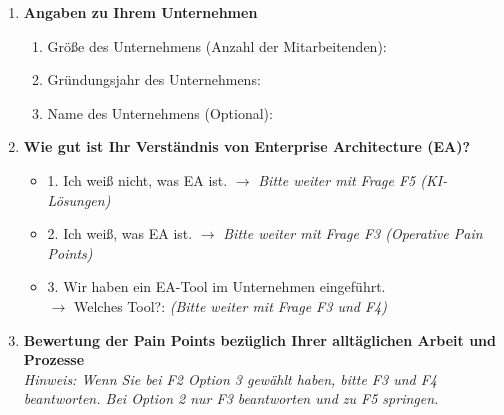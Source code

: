 \documentclass[11pt,a4paper]{article}
\begin{document}
\begin{enumerate}[label=\textbf{F\arabic*.}, leftmargin=*, itemsep=0.2cm]

    \item \textbf{Angaben zu Ihrem Unternehmen}
    \begin{enumerate}[label=\alph*), itemsep=0.05cm, topsep=0.05cm]
        \item Größe des Unternehmens (Anzahl der Mitarbeitenden): \underline{\hspace{5cm}}
        \item Gründungsjahr des Unternehmens: \underline{\hspace{5cm}}
        \item Name des Unternehmens (Optional): \underline{\hspace{5cm}}
    \end{enumerate}

    \vspace{0.1cm}

    \item \textbf{Wie gut ist Ihr Verständnis von Enterprise Architecture (EA)?}
    \begin{itemize}[label=$\bigcirc$, itemsep=0.02cm, topsep=0.05cm]
        \item 1. Ich weiß nicht, was EA ist. $\rightarrow$ \textit{Bitte weiter mit Frage F5 (KI-Lösungen)}
        \item 2. Ich weiß, was EA ist. $\rightarrow$ \textit{Bitte weiter mit Frage F3 (Operative Pain Points)}
        \item 3. Wir haben ein EA-Tool im Unternehmen eingeführt. \\
        $\rightarrow$ Welches Tool?: \underline{\hspace{5cm}} \textit{(Bitte weiter mit Frage F3 und F4)}
    \end{itemize}

    \vspace{0.1cm}

    \item \textbf{Bewertung der Pain Points bezüglich Ihrer alltäglichen Arbeit und Prozesse} \\
    {\small\textit{Hinweis: Wenn Sie bei F2 Option 3 gewählt haben, bitte F3 und F4 beantworten. Bei Option 2 nur F3 beantworten und zu F5 springen.}}
    

\end{enumerate}
\end{document}
